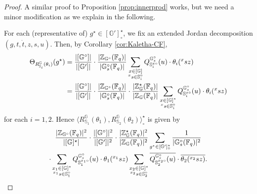 \documentclass{amsart}
\newcommand{\F}{\mathbb{F}}
\newcommand{\bbS}{\mathbb{S}}
\newcommand{\bbG}{\mathbb{G}}
\newcommand{\bbZ}{\mathbb{Z}}
\theoremstyle{plain}
\theoremstyle{definition}
\theoremstyle{remark}
\theoremstyle{theorem}
\begin{document}
\begin{proof}
A similar proof to Proposition \ref{prop:innerprod} works, but we need a minor modification as we explain in the following.

For each (representative of) $g^{\star}\in[\bbG']^{\star}_{\circ}$, we fix an extended Jordan decomposition $(g,t,\dot{t},z,s,u)$.
Then, by Corollary \ref{cor:Kaletha-CF}, 
\begin{align*}
\Theta_{R_{\bbS_i}^{\bbG}(\theta_i)}(g^{\star})
&=
\frac{|[\bbG^{\circ}]|}{|[\bbG']|}
\cdot\frac{|\bbZ_{\bbG^{\circ}}(\F_{q})|}{|\bbG^{\circ}_{s}(\F_{q})|}
\sum_{\begin{subarray}{c}x\in [\bbG] \\ {}^{x}s\in\bbS_{i}^{\circ}\end{subarray}}
Q^{\bbG^{\circ}_{s}}_{\bbS_{i}^{x\circ}}(u)\cdot \theta_{i}({}^{x}sz)\\
&=
\frac{|[\bbG^{\circ}]|}{|[\bbG']|}
\cdot\frac{|\bbZ_{\bbG^{\circ}}(\F_{q})|}{|\bbG^{\circ}_{s}(\F_{q})|}
\cdot\frac{|\bbZ^{\star}_{\bbG}(\F_{q})|}{|\bbZ_{\bbG}(\F_{q})|}
\sum_{\begin{subarray}{c}x\in [\bbG]^{\star} \\ {}^{x}s\in\bbS_{i}^{\circ}\end{subarray}}
Q^{\bbG^{\circ}_{s}}_{\bbS_{i}^{x\circ}}(u)\cdot \theta_{i}({}^{x}sz)
\end{align*}
for each $i=1,2$.
Hence $\langle R_{\bbS_1}^{\bbG}(\theta_1),R_{\bbS_2}^{\bbG}(\theta_2)\rangle^{\star}_{\circ}$ is given by
\begin{multline*}
\frac{|\bbZ_{\bbG^{\circ}}(\F_{q})|^{2}}{|[\bbG]^{\star}|}
\cdot\frac{|[\bbG^{\circ}]|^{2}}{|[\bbG']|^{2}}
\cdot\frac{|\bbZ^{\star}_{\bbG}(\F_{q})|^{2}}{|\bbZ_{\bbG}(\F_{q})|^{2}}
\sum_{g^{\star}\in[\bbG']^{\star}_{\circ}}
\frac{1}{|\bbG_{s}^{\circ}(\F_{q})|^{2}}\\
\cdot\sum_{\begin{subarray}{c}x_{1}\in [\bbG]^{\star} \\ {}^{x_{1}}s\in\bbS_{1}^{\circ}\end{subarray}}
Q^{\bbG^{\circ}_{s}}_{\bbS_{1}^{x_{1}\circ}}(u)\cdot \theta_{1}({}^{x_{1}}sz)
\sum_{\begin{subarray}{c}x_{2}\in [\bbG]^{\star} \\ {}^{x_{2}}s\in\bbS_{2}^{\circ}\end{subarray}}
\overline{Q^{\bbG^{\circ}_{s}}_{\bbS_{2}^{x_{2}\circ}}(u)}\cdot\overline{\theta_{2}({}^{x_{2}}sz)}.
\end{multline*}


\end{proof}
\end{document}
